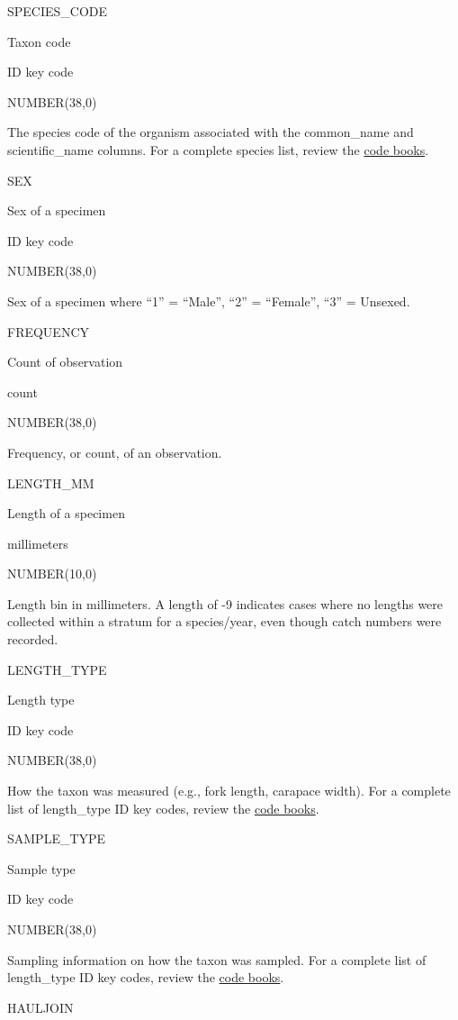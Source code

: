\documentclass[
  letterpaper,
  oneside,
  open=any]{scrbook}
\begin{document}
SPECIES\_CODE

Taxon code

ID key code

NUMBER(38,0)

The species code of the organism associated with the common\_name and
scientific\_name columns. For a complete species list, review the
\href{https://www.fisheries.noaa.gov/resource/document/groundfish-survey-species-code-manual-and-data-codes-manual}{code
books}.

SEX

Sex of a specimen

ID key code

NUMBER(38,0)

Sex of a specimen where ``1'' = ``Male'', ``2'' = ``Female'', ``3'' =
Unsexed.

FREQUENCY

Count of observation

count

NUMBER(38,0)

Frequency, or count, of an observation.

LENGTH\_MM

Length of a specimen

millimeters

NUMBER(10,0)

Length bin in millimeters. A length of -9 indicates cases where no
lengths were collected within a stratum for a species/year, even though
catch numbers were recorded.

LENGTH\_TYPE

Length type

ID key code

NUMBER(38,0)

How the taxon was measured (e.g., fork length, carapace width). For a
complete list of length\_type ID key codes, review the
\href{https://www.fisheries.noaa.gov/resource/document/groundfish-survey-species-code-manual-and-data-codes-manual}{code
books}.

SAMPLE\_TYPE

Sample type

ID key code

NUMBER(38,0)

Sampling information on how the taxon was sampled. For a complete list
of length\_type ID key codes, review the
\href{https://www.fisheries.noaa.gov/resource/document/groundfish-survey-species-code-manual-and-data-codes-manual}{code
books}.

HAULJOIN
\end{document}

